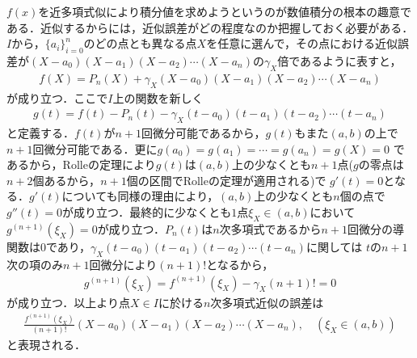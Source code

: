 \documentclass[a4j,papersize,disablejfam,slide,14pt]{jsarticle}
\begin{document}
    $f(x)$を近多項式似により積分値を求めようというのが数値積分の根本の趣意である．近似するからには，近似誤差がどの程度なのか把握しておく必要がある．
    $I$から，$\{a_i\}_{i=0}^{n}$のどの点とも異なる点$X$を任意に選んで，その点における近似誤差が$(X-a_0)(X-a_1)(X-a_2)\cdots(X-a_n)$の$\gamma_X$倍であるように表すと，
    \begin{align}
    	f(X) = P_n(X) + \gamma_X(X-a_0)(X-a_1)(X-a_2)\cdots(X-a_n)
    \end{align}
    が成り立つ．ここで$I$上の関数を新しく
    \begin{align}
    	g(t) = f(t) - P_n(t) - \gamma_X(t-a_0)(t-a_1)(t-a_2)\cdots(t-a_n)
    \end{align}
    と定義する．$f(t)$が$n+1$回微分可能であるから，$g(t)$もまた$(a,b)$の上で$n+1$回微分可能である．更に$g(a_0) = g(a_1) = \cdots = g(a_n) = g(X) = 0$
    であるから，{\rm Rolle}の定理により$g(t)$は$(a,b)$上の少なくとも$n+1$点($g$の零点は$n+2$個あるから，$n+1$個の区間で{\rm Rolle}の定理が適用される)で
    $g'(t) = 0$となる．$g'(t)$についても同様の理由により，$(a,b)$上の少なくとも$n$個の点で$g''(t)=0$が成り立つ．最終的に少なくとも$1$点$\xi_X \in (a,b)$において
    $g^{(n+1)}(\xi_X)=0$が成り立つ．$P_n(t)$は$n$次多項式であるから$n+1$回微分の導関数は$0$であり，$\gamma_X(t-a_0)(t-a_1)(t-a_2)\cdots(t-a_n)$に関しては
    $t$の$n+1$次の項のみ$n+1$回微分により$(n+1)!$となるから，
    \begin{align}
    	g^{(n+1)}(\xi_X) = f^{(n+1)}(\xi_X) - \gamma_X(n+1)! = 0
    \end{align}
    が成り立つ．以上より点$X \in I$に於ける$n$次多項式近似の誤差は
    \begin{align}
    	\frac{f^{(n+1)}(\xi_X)}{(n+1)!}(X-a_0)(X-a_1)(X-a_2)\cdots(X-a_n), \quad (\xi_X \in (a,b))
    \end{align}
    と表現される．
\end{document}
